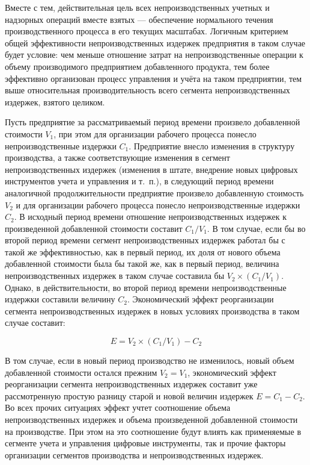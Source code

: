 \documentclass{article}
\begin{document}
Вместе с тем, действительная цель всех непроизводственных учетных и надзорных операций вместе взятых — обеспечение нормального течения производственного процесса в его текущих масштабах. Логичным критерием общей эффективности непроизводственных издержек предприятия в таком случае будет условие: чем меньше отношение затрат на непроизводственные операции к объему производимого предприятием добавленного продукта, тем более эффективно организован процесс управления и учёта на таком предприятии, тем выше относительная производительность всего сегмента непроизводственных издержек, взятого целиком.

Пусть предприятие за рассматриваемый период времени произвело добавленной стоимости $V_1$, при этом для организации рабочего процесса понесло непроизводственные издержки $C_1$. Предприятие внесло изменения в структуру производства, а также соответствующие изменения в сегмент непроизводственных издержек (изменения в штате, внедрение новых цифровых инструментов учета и управления и т.~п.), в следующий период времени аналогичной продолжительности предприятие произвело добавленную стоимость $V_2$ и для организации рабочего процесса понесло непроизводственные издержки $C_2$. В исходный период времени отношение непроизводственных издержек к произведенной добавленной стоимости составит $C_1 / V_1$. В том случае, если бы во второй период времени сегмент непроизводственных издержек работал бы с такой же эффективностью, как в первый период, их доля от нового объема добавленной стоимости была бы такой же, как в первый период, величина непроизводственных издержек в таком случае составила бы $V_2 \times (C_1 / V_1)$. Однако, в действительности, во второй период времени непроизводственные издержки составили величину $C_2$. Экономический эффект реорганизации сегмента непроизводственных издержек в новых условиях производства в таком случае составит:

$$
E = V_2 \times (C_1 / V_1) - C_2
$$

В том случае, если в новый период производство не изменилось, новый объем добавленной стоимости остался прежним $V_2 = V_1$, экономический эффект реорганизации сегмента непроизводственных издержек составит уже рассмотренную простую разницу старой и новой величин издержек $E = C_1 - C_2$. Во всех прочих ситуациях эффект учтет соотношение объема непроизводственных издержек и объема произведенной добавленной стоимости на производстве. При этом на это соотношение будут влиять как применяемые в сегменте учета и управления цифровые инструменты, так и прочие факторы организации сегментов производства и непроизводственных издержек.
\end{document}
